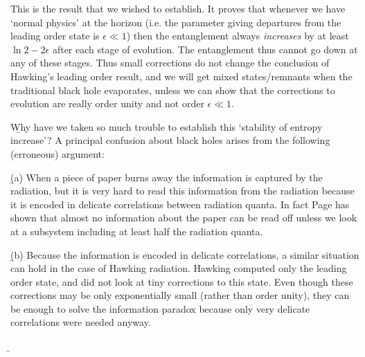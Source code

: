 \documentclass[12pt]{article}
\begin{document}
This is the result that we wished to establish. It proves that whenever we have `normal physics' at the horizon (i.e. the parameter giving departures from the leading order state is $\epsilon\ll 1$)
then the entanglement always {\it increases} by at least $\ln 2-2\epsilon$ after each stage of evolution. The entanglement thus cannot go down at any of these stages. Thus small corrections do not change the conclusion of Hawking's leading order result, and we will get mixed states/remnants when the traditional black hole evaporates, unless we can show that the corrections to evolution are really order unity and not order $\epsilon\ll 1$.



\b

Why have we taken so much trouble to establish this `stability of entropy increase'? 
A principal confusion about black holes arises from the following (erroneous) argument: 

\b

(a) When a piece of paper burns away the information is captured by the radiation, but it is very hard to read this information from the radiation because it is encoded in delicate correlations between radiation quanta. In fact Page \cite{page} has shown that almost no information about the paper can be read off unless we look at a subsystem including at least half the radiation quanta.

\b

(b) Because the information is encoded in delicate correlations, a similar situation can hold in the case of Hawking radiation. Hawking computed only the leading order state, and did not look at tiny corrections to this state. Even though these corrections may be only exponentially small (rather than order unity), they can be enough to solve the information paradox because only very delicate correlations were needed anyway.

\b
\end{document}
